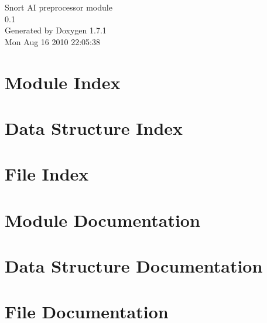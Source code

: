 \documentclass[a4paper]{book}
\begin{document}
\hypersetup{pageanchor=false}
\begin{titlepage}
\vspace*{7cm}
\begin{center}
{\Large Snort AI preprocessor module \\[1ex]\large 0.1 }\\
\vspace*{1cm}
{\large Generated by Doxygen 1.7.1}\\
\vspace*{0.5cm}
{\small Mon Aug 16 2010 22:05:38}\\
\end{center}
\end{titlepage}
\clearemptydoublepage
{}
\tableofcontents
\clearemptydoublepage
{}
\hypersetup{pageanchor=true}
\chapter{Module Index}

\chapter{Data Structure Index}

\chapter{File Index}

\chapter{Module Documentation}

\chapter{Data Structure Documentation}







\chapter{File Documentation}









\printindex
\end{document}
